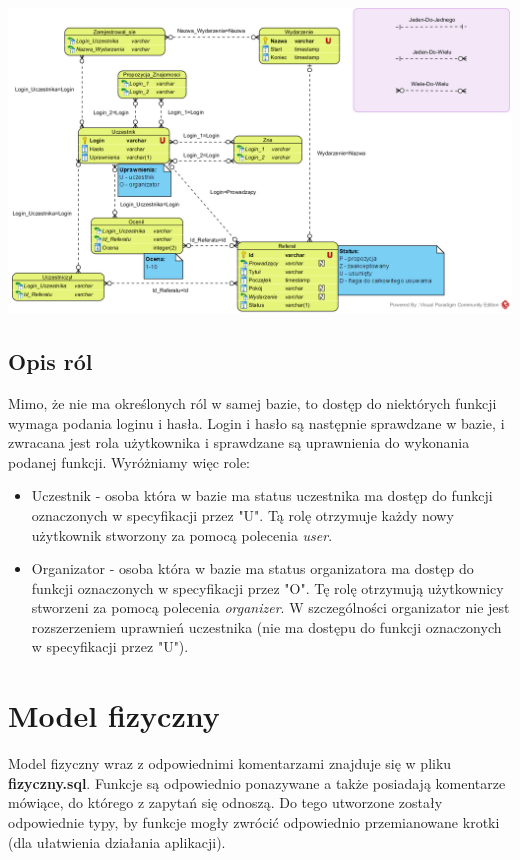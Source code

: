 \documentclass[a4paper]{article}
\begin{document}
\centerline{\includegraphics[angle=90,scale=1]{konceptualny.png}}


\subsection{Opis ról}
Mimo, że nie ma określonych ról w samej bazie, to dostęp do niektórych funkcji wymaga podania loginu i hasła. Login i hasło są następnie sprawdzane w bazie, i zwracana jest rola użytkownika i sprawdzane są uprawnienia do wykonania podanej funkcji. Wyróżniamy więc role:
\begin{itemize}
\item Uczestnik - osoba która w bazie ma status uczestnika ma dostęp do funkcji oznaczonych w specyfikacji przez "U". Tą rolę otrzymuje każdy nowy użytkownik stworzony za pomocą polecenia \textit{user}.
\item Organizator - osoba która w bazie ma status organizatora ma dostęp do funkcji oznaczonych w specyfikacji przez "O". Tę rolę otrzymują użytkownicy stworzeni za pomocą polecenia \textit{organizer}. W szczególności organizator nie jest rozszerzeniem uprawnień uczestnika (nie ma dostępu do funkcji oznaczonych w specyfikacji przez "U").	\end{itemize}

\section{Model fizyczny}
Model fizyczny wraz z odpowiednimi komentarzami znajduje się w pliku \textbf{fizyczny.sql}. Funkcje są odpowiednio ponazywane a także posiadają komentarze mówiące, do którego z zapytań się odnoszą. Do tego utworzone zostały odpowiednie typy, by funkcje mogły zwrócić odpowiednio przemianowane krotki (dla ułatwienia działania aplikacji).
\end{document}
